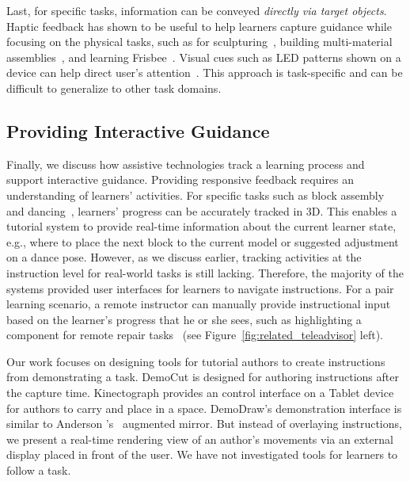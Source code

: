 Last, for specific tasks, information can be conveyed \emph{directly via target objects}. Haptic feedback has shown to be useful to help learners capture guidance while focusing on the physical tasks, such as for sculpturing~\cite{Zoran:2013:FFD:2470654.2481361,Agrawal:2015:PPS:2807442.2807505}, building multi-material assemblies~\cite{Schoop:2016:DSS:2851581.2892429}, and learning Frisbee~\cite{Solomon:2014:UTI:2540930.2540965}. Visual cues such as LED patterns shown on a device can help direct user's attention~\cite{Solomon:2014:UTI:2540930.2540965,Vasey:2016:HHR:2897839.2927404}.
%
This approach is task-specific and can be difficult to generalize to other task domains.

\subsection{Providing Interactive Guidance}
Finally, we discuss how assistive technologies track a learning process and support interactive guidance. Providing responsive feedback requires an understanding of learners' activities. For specific tasks such as block assembly~\cite{Gupta2012DuploTrack,Wu:2016:ARI:2856400.2856416} and dancing~\cite{Anderson:2013:YEM:2501988.2502045}, learners' progress can be accurately tracked in 3D. This enables a tutorial system to provide real-time information about the current learner state, e.g., where to place the next block to the current model or suggested adjustment on a dance pose.
%
However, as we discuss earlier, tracking activities at the instruction level for real-world tasks is still lacking. Therefore, the majority of the systems provided user interfaces for learners to navigate instructions.
%
For a pair learning scenario, a remote instructor can manually provide instructional input based on the learner's progress that he or she sees, such as highlighting a component for remote repair tasks~\cite{Gurevich:2012ko,Kirk:2006:CRG:1124772.1124951} (see Figure~\ref{fig:related_teleadvisor} left).

Our work focuses on designing tools for tutorial authors to create instructions from demonstrating a task. DemoCut is designed for authoring instructions after the capture time. Kinectograph provides an control interface on a Tablet device for authors to carry and place in a space. DemoDraw's demonstration interface is similar to Anderson \ea{}'s~\cite{Anderson:2013:YEM:2501988.2502045} augmented mirror. But instead of overlaying instructions, we present a real-time rendering view of an author's movements via an external display placed in front of the user. We have not investigated tools for learners to follow a task.

